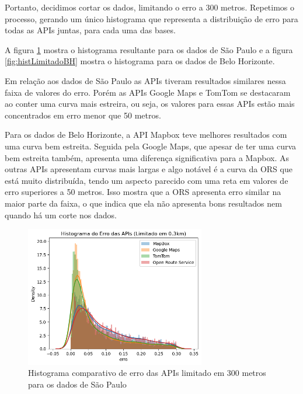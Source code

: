 Portanto, decidimos cortar os dados, limitando o erro a 300 metros. Repetimos o processo, gerando um único histograma que representa a distribuição de erro para todas as APIs juntas, para cada uma das bases. 

A figura \ref{fig:histLimitadoSP} mostra o histograma resultante para os dados de São Paulo e a figura \ref{fig:histLimitadoBH} mostra o histograma para os dados de Belo Horizonte. 

Em relação aos dados de São Paulo as APIs tiveram resultados similares nessa faixa de valores do erro. Porém as APIs Google Maps e TomTom se destacaram ao conter uma curva mais estreira, ou seja, os valores para essas APIs estão mais concentrados em erro menor que 50 metros. 

Para os dados de Belo Horizonte, a API Mapbox teve melhores resultados com uma curva bem estreita. Seguida pela Google Maps, que apesar de ter uma curva bem estreita também, apresenta uma diferença significativa para a Mapbox. As outras APIs apresentam curvas mais largas e algo notável é a curva da ORS que está muito distribuída, tendo um aspecto parecido com uma reta em valores de erro superiores a 50 metros. Isso mostra que a ORS apresenta erro similar na maior parte da faixa, o que indica que ela não apresenta bons resultados nem quando há um corte nos dados.

\begin{figure}[h]
  \centering
  \includegraphics[width=0.7\textwidth]{Figuras/histLimitadoSP.png}
  \caption{Histograma comparativo de erro das APIs limitado em 300 metros para os dados de São Paulo}
  \label{fig:histLimitadoSP}
\end{figure}

